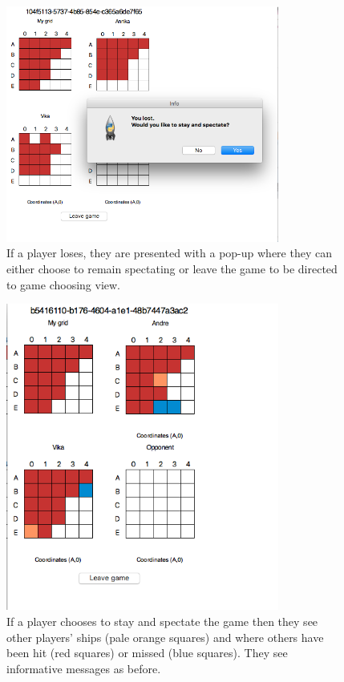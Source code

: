 \documentclass[]{article}
\begin{document}
\begin{figure}[!hbt]
	\centering
	\includegraphics[width=0.8\textwidth]{LoserChoose.png}
	\caption{If a player loses, they are presented with a pop-up where they can either choose to remain spectating or leave the game to be directed to game choosing view.}
	\label{fig:LoserChoose}
\end{figure}

\begin{figure}[!hbt]
	\centering
	\includegraphics[width=0.8\textwidth]{SpectateInit.png}
	\caption{If a player chooses to stay and spectate the game then they see other players' ships (pale orange squares) and where others have been hit (red squares) or missed (blue squares). They see informative messages as before.}
	\label{fig:SpectateInit}
\end{figure}
\end{document}
